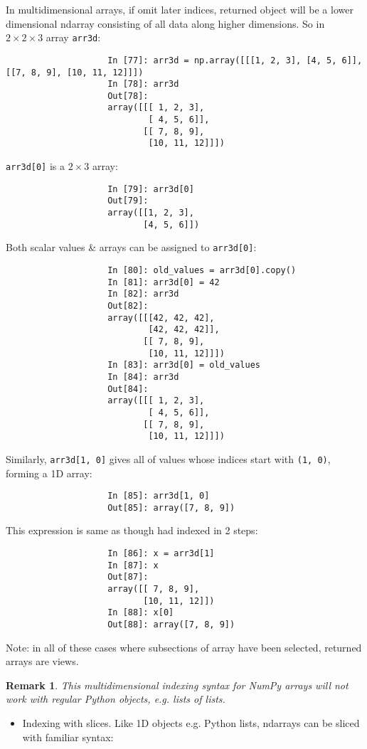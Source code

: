 \documentclass{article}
\newtheorem{remark}{Remark}
\begin{document}
\begin{enumerate}
\begin{itemize}
\begin{itemize}
\begin{itemize}
				In multidimensional arrays, if omit later indices, returned object will be a lower dimensional ndarray consisting of all data along higher dimensions. So in $2\times2\times3$ array {\tt arr3d}:
				\begin{verbatim}
					In [77]: arr3d = np.array([[[1, 2, 3], [4, 5, 6]], [[7, 8, 9], [10, 11, 12]]])
					In [78]: arr3d
					Out[78]:
					array([[[ 1, 2, 3],
					        [ 4, 5, 6]],
					       [[ 7, 8, 9],
					        [10, 11, 12]]])
				\end{verbatim}
				{\tt arr3d[0]} is a $2\times3$ array:
				\begin{verbatim}
					In [79]: arr3d[0]
					Out[79]:
					array([[1, 2, 3],
					       [4, 5, 6]])
				\end{verbatim}
				Both scalar values \& arrays can be assigned to {\tt arr3d[0]}:
				\begin{verbatim}
					In [80]: old_values = arr3d[0].copy()
					In [81]: arr3d[0] = 42
					In [82]: arr3d
					Out[82]:
					array([[[42, 42, 42],
					        [42, 42, 42]],
					       [[ 7, 8, 9],
					        [10, 11, 12]]])
					In [83]: arr3d[0] = old_values
					In [84]: arr3d
					Out[84]:
					array([[[ 1, 2, 3],
					        [ 4, 5, 6]],
					       [[ 7, 8, 9],
					        [10, 11, 12]]])
				\end{verbatim}
				Similarly, {\tt arr3d[1, 0]} gives all of values whose indices start with {\tt(1, 0)}, forming a 1D array:
				\begin{verbatim}
					In [85]: arr3d[1, 0]
					Out[85]: array([7, 8, 9])
				\end{verbatim}
				This expression is same as though had indexed in 2 steps:
				\begin{verbatim}
					In [86]: x = arr3d[1]
					In [87]: x
					Out[87]:
					array([[ 7, 8, 9],
					       [10, 11, 12]])
					In [88]: x[0]
					Out[88]: array([7, 8, 9])
				\end{verbatim}
				Note: in all of these cases where subsections of array have been selected, returned arrays are views.
				\begin{remark}
					This multidimensional indexing syntax for NumPy arrays will not work with regular Python objects, e.g. lists of lists.
				\end{remark}
				\begin{itemize}
					\item {\sf Indexing with slices.} Like 1D objects e.g. Python lists, ndarrays can be sliced with familiar syntax:
					\begin{verbatim}

\end{verbatim}
\end{itemize}
\end{itemize}
\end{itemize}
\end{itemize}
\end{enumerate}
\end{document}
